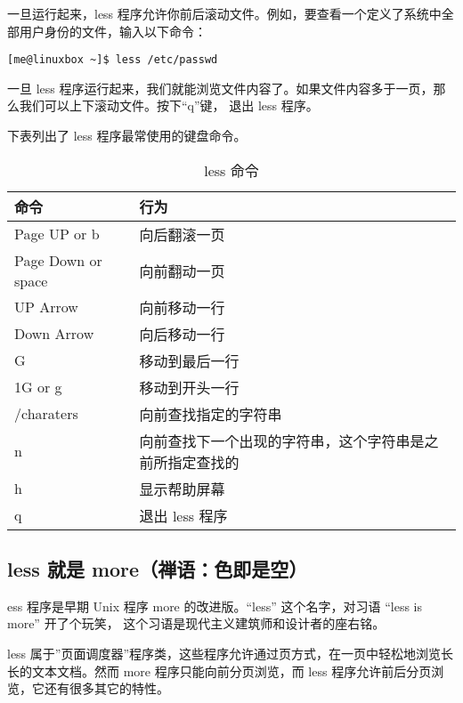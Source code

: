 \par 一旦运行起来，less 程序允许你前后滚动文件。例如，要查看一个定义了系统中全部用户身份的文件，输入以下命令：
\begin{lstlisting}
[me@linuxbox ~]$ less /etc/passwd
\end{lstlisting}

\par 一旦 less 程序运行起来，我们就能浏览文件内容了。如果文件内容多于一页，那么我们可以上下滚动文件。按下“q”键， 退出 less 程序。

\par 下表列出了 less 程序最常使用的键盘命令。
\begin{table}[ht!]
\caption{less 命令}
\label{table_example}
\centering
\begin{tabular}{p{4cm}p{11cm}}
\hline
命令 & 行为\\

\hline
Page UP or b &	向后翻滚一页\\
Page Down or space & 向前翻动一页 \\
UP Arrow & 向前移动一行\\
Down Arrow &	向后移动一行\\
G	& 移动到最后一行\\
1G or g	& 移动到开头一行\\
/charaters	& 向前查找指定的字符串\\
n	& 向前查找下一个出现的字符串，这个字符串是之前所指定查找的\\
h	& 显示帮助屏幕\\
q	& 退出 less 程序\\
\hline
\end{tabular}
\end{table}

\fboxrule=6pt \fboxsep=4pt
\begin{colorboxed}[boxcolor=lightgray,bgcolor=white]
\subsection{less 就是 more（禅语：色即是空）}

ess 程序是早期 Unix 程序 more 的改进版。“less” 这个名字，对习语 “less is more” 开了个玩笑， 这个习语是现代主义建筑师和设计者的座右铭。

\par less 属于”页面调度器”程序类，这些程序允许通过页方式，在一页中轻松地浏览长长的文本文档。然而 more 程序只能向前分页浏览，而 less 程序允许前后分页浏览，它还有很多其它的特性。
\end{colorboxed}


